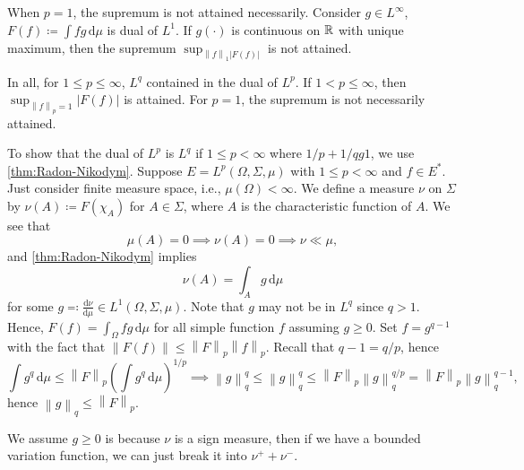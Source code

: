 \begin{remark}
	When \(p = 1\), the supremum is not attained necessarily. Consider \(g\in L^{\infty} \), \(F(f) \coloneqq \int fg\,\mathrm{d} \mu \) is dual of \(L^1\). If \(g(\cdot)\) is continuous on \(\mathbb{\MakeUppercase{r}} \) with unique maximum, then the supremum \(\sup _{\left\lVert f\right\rVert _1 \left\vert F(f) \right\vert }\) is not attained.
\end{remark}

\begin{note}
	In all, for \(1 \leq p\leq \infty \), \(L^q\) contained in the dual of \(L^p\). If \(1 < p \leq \infty \), then \(\sup _{\left\lVert f\right\rVert _p = 1} \left\vert F(f) \right\vert \) is attained. For \(p = 1\), the supremum is not necessarily attained.
\end{note}

To show that the dual of \(L^p\) is \(L^q\) if \(1 \leq p < \infty \) where \(1 / p + 1 / q g 1\), we use \autoref{thm:Radon-Nikodym}. Suppose \(E = L^p(\Omega , \Sigma , \mu )\) with \(1 \leq p < \infty \) and \(f\in E^{\ast} \). Just consider finite measure space, i.e., \(\mu (\Omega ) < \infty \). We define a measure \(\nu \) on \(\Sigma \) by \(\nu (A) \coloneqq F(\chi _A)\) for \(A\in \Sigma \), where \(A\) is the characteristic function of \(A\). We see that
\[
	\mu (A) = 0 \implies \nu (A) = 0 \implies \nu \ll \mu,
\]
and \autoref{thm:Radon-Nikodym} implies
\[
	\nu (A) = \int _A g\,\mathrm{d} \mu
\]
for some \(g \eqqcolon \frac{\mathrm{d}\nu }{\mathrm{d}\mu } \in L^1(\Omega , \Sigma , \mu )\). Note that \(g\) may not be in \(L^q\) since \(q > 1\). Hence, \(F(f)= \int _\Omega fg \,\mathrm{d} \mu \) for all simple function \(f\) assuming \(g \geq 0\). Set \(f = g^{q - 1}\) with the fact that \(\left\lVert F(f)\right\rVert \leq \left\lVert F\right\rVert _p \left\lVert f\right\rVert _p\). Recall that \(q - 1 = q / p\), hence
\[
	\int g^q\,\mathrm{d} \mu \leq \left\lVert F\right\rVert _p \left( \int g^q \,\mathrm{d} \mu  \right) ^{1 / p} \implies \left\lVert g\right\rVert _q ^q \leq \left\lVert g\right\rVert _q^q \leq \left\lVert F\right\rVert _p \left\lVert g\right\rVert _q ^{q / p} = \left\lVert F\right\rVert _p \left\lVert g\right\rVert _q ^{q - 1},
\]
hence \(\left\lVert g\right\rVert _q \leq \left\lVert F\right\rVert _p\).

\begin{note}
	We assume \(g \geq 0\) is because \(\nu \) is a sign measure, then if we have a bounded variation function, we can just break it into \(\nu ^+ + \nu ^-\).
\end{note}

